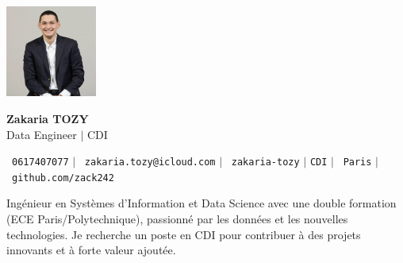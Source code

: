 \documentclass[11pt,a4paper]{article}
\begin{document}
\begin{center}
  \begin{minipage}[c]{0.2\textwidth}
    \includegraphics[width=3cm]{images/profilpicture.png}
  \end{minipage}%
  \begin{minipage}[c]{0.8\textwidth}
    {\LARGE \textbf{Zakaria TOZY}} \\ \vspace{8pt}
    {\large Data Engineer $|$ CDI} \vspace{5pt}
  \end{minipage}
\end{center}


\begin{center}
    \small \faPhone\ \texttt{0617407077} \hspace{1pt} $|$
    \hspace{1pt} \faEnvelope\ \texttt{zakaria.tozy@icloud.com} \hspace{1pt} $|$
    \hspace{1pt} \faLinkedin\ \texttt{zakaria-tozy} \hspace{1pt} $|$
    \hspace{1pt} \texttt{CDI} \hspace{1pt} $|$
    \hspace{1pt} \faMapMarker\ \texttt{Paris} \hspace{1pt} $|$
    \hspace{1pt} \faGithub\ \texttt{github.com/zack242} \\ \vspace{10pt}
\end{center}

\begin{itemize}[leftmargin=0in, label={}]
\small{\item{
Ingénieur en Systèmes d'Information et Data Science avec une double formation (ECE Paris/Polytechnique), passionné par les données et les nouvelles technologies. Je recherche un poste en CDI pour contribuer à des projets innovants et à forte valeur ajoutée.
}}
\end{itemize}
\end{document}
